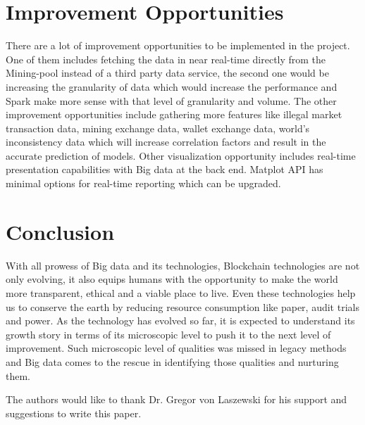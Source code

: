 \documentclass[sigconf]{acmart}
\begin{document}
\section{Improvement Opportunities}
There are a lot of improvement opportunities to be implemented in the project. One of them includes fetching the data in near real-time directly from the Mining-pool instead of a third party data service, the second one would be increasing the granularity of data which would increase the performance and  Spark make more sense with that level of granularity and volume. The other improvement opportunities include gathering more features like illegal market transaction data, mining exchange data, wallet exchange data, world's inconsistency data which will increase correlation factors and result in the accurate prediction of models. Other visualization opportunity includes real-time presentation capabilities with Big data at the back end. Matplot API has minimal options for real-time reporting which can be upgraded.

\section{Conclusion}

With all prowess of Big data and its technologies, Blockchain technologies are not only evolving, it also equips humans with the opportunity to make the world more transparent, ethical and a viable place to live. Even these technologies help us to conserve the earth by reducing resource consumption like paper, audit trials and power. As the technology has evolved so far, it is expected to understand its growth story in terms of its microscopic level to push it to the next level of improvement. Such microscopic level of qualities was missed in legacy methods and Big data comes to the rescue in identifying those qualities and nurturing them.


\begin{acks}
  The authors would like to thank Dr. Gregor von Laszewski for his support and suggestions to write this paper.
\end{acks}


 


\end{document}
